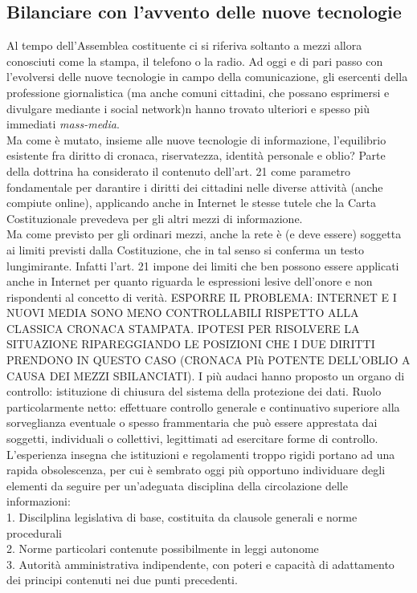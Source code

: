 \subsection{Bilanciare con l'avvento delle nuove tecnologie}
Al tempo dell'Assemblea costituente ci si riferiva soltanto a mezzi allora conosciuti come la stampa, il telefono o la radio. Ad oggi e di pari passo con l'evolversi delle nuove tecnologie in campo della comunicazione, gli esercenti della professione giornalistica (ma anche comuni cittadini, che possano esprimersi e divulgare mediante i social network)n hanno trovato ulteriori e spesso più immediati \textit{mass-media}.
\\Ma come è mutato, insieme alle nuove tecnologie di informazione, l'equilibrio esistente fra diritto di cronaca, riservatezza, identità personale e oblio?
Parte della dottrina ha considerato il contenuto dell'art. 21 come parametro fondamentale per darantire i diritti dei cittadini nelle diverse attività (anche compiute online), applicando anche in Internet le stesse tutele che la Carta Costituzionale prevedeva per gli altri mezzi di informazione.
\\Ma come previsto per gli ordinari mezzi, anche la rete è (e deve essere) soggetta ai limiti previsti dalla Costituzione, che in tal senso si conferma un testo lungimirante.
Infatti l'art. 21 impone dei limiti che ben possono essere applicati anche in Internet per quanto riguarda le espressioni lesive dell'onore e non rispondenti al concetto di verità.
ESPORRE IL PROBLEMA: INTERNET E I NUOVI MEDIA SONO MENO CONTROLLABILI RISPETTO ALLA CLASSICA CRONACA STAMPATA. IPOTESI PER RISOLVERE LA SITUAZIONE RIPAREGGIANDO LE POSIZIONI CHE I DUE DIRITTI PRENDONO IN QUESTO CASO (CRONACA PIù POTENTE DELL'OBLIO A CAUSA DEI MEZZI SBILANCIATI).
I più audaci hanno proposto un organo di controllo: istituzione di chiusura del sistema della protezione dei dati. Ruolo particolarmente netto: effettuare controllo generale e continuativo superiore alla sorveglianza eventuale o spesso frammentaria che può essere apprestata dai soggetti, individuali o collettivi, legittimati ad esercitare forme di controllo.
L'esperienza insegna che istituzioni e regolamenti troppo rigidi portano ad una rapida obsolescenza, per cui è sembrato oggi più opportuno individuare degli elementi da seguire per un'adeguata disciplina della circolazione delle informazioni:
\\1. Discilplina legislativa di base, costituita da clausole generali e norme procedurali
\\2. Norme particolari contenute possibilmente in leggi autonome
\\3. Autorità amministrativa indipendente, con poteri e capacità di adattamento dei principi contenuti nei due punti precedenti.
